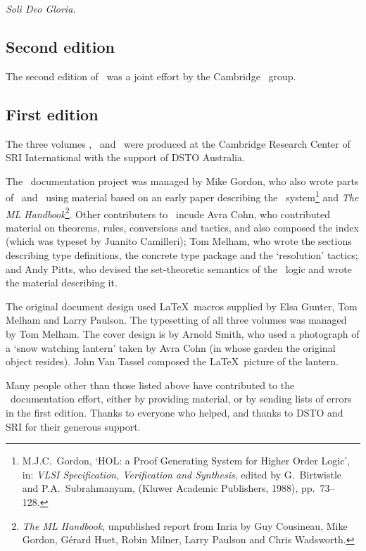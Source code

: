 \medskip

{\it Soli Deo Gloria.}

\newpage

\subsection*{Second edition}

The second edition of \REFERENCE\ was a joint effort by the Cambridge
\HOL\ group.

\subsection*{First edition}

The three volumes \TUTORIAL, \DESCRIPTION\ and \REFERENCE\ were
produced at the Cambridge Research Center of SRI International with
the support of DSTO Australia.

The \HOL\ documentation project was managed by Mike Gordon, who also
wrote parts of \DESCRIPTION\ and \TUTORIAL\ using material based on an
early paper describing the \HOL\ system\footnote{M.J.C.\ Gordon, `HOL:
  a Proof Generating System for Higher Order Logic', in: {\it VLSI
    Specification, Verification and Synthesis\/}, edited by G.\
  Birtwistle and P.A.\ Subrahmanyam, (Kluwer Academic Publishers,
  1988), pp.\ 73--128.} and {\sl The ML Handbook\/}\footnote{{\sl The
    ML Handbook}, unpublished report from Inria by Guy Cousineau, Mike
  Gordon, G\'erard Huet, Robin Milner, Larry Paulson and Chris
  Wadsworth.}.  Other contributers to \DESCRIPTION\ incude Avra Cohn,
who contributed material on theorems, rules, conversions and tactics,
and also composed the index (which was typeset by Juanito Camilleri);
Tom Melham, who wrote the sections describing type definitions, the
concrete type package and the `resolution' tactics; and Andy Pitts,
who devised the set-theoretic semantics of the \HOL\ logic and wrote
the material describing it.

The original document design used \LaTeX\ macros supplied by Elsa
Gunter, Tom Melham and Larry Paulson.  The typesetting of all three
volumes was managed by Tom Melham.  The cover design is by Arnold
Smith, who used a photograph of a `snow watching lantern' taken by
Avra Cohn (in whose garden the original object resides).  John Van
Tassel composed the \LaTeX\ picture of the lantern.

Many people other than those listed above have contributed to the
\HOLW\ documentation effort, either by providing material, or by
sending lists of errors in the first edition.  Thanks to everyone who
helped, and thanks to DSTO and SRI for their generous support.




